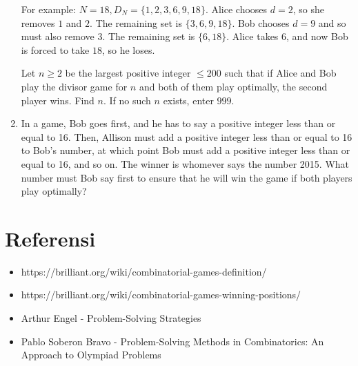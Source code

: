 \documentclass[11pt]{scrartcl}
\begin{document}
\begin{enumerate}
    For example: $ N = 18, D_N = \{ 1,2,3,6,9,18 \} $. Alice chooses $ d=2 $, so she removes $ 1 $ and $ 2 $. The remaining set is $ \{3,6,9,18\} $. Bob chooses $ d = 9 $ and so must also remove $ 3 $. The remaining set is $ \{6,18\} $. Alice takes $ 6 $, and now Bob is forced to take $ 18 $, so he loses.

    Let $ n \ge 2 $ be the largest positive integer $ \le 200 $ such that if Alice and Bob play the divisor game for $ n $ and both of them play optimally, the second player wins. Find $ n $. If no such $ n $ exists, enter $ 999 $.

    \item In a game, Bob goes first, and he has to say a positive integer less than or equal to 16. Then, Allison must add a positive integer less than or equal to 16 to Bob’s number, at which point Bob must add a positive integer less than or equal to 16, and so on. The winner is whomever says the number 2015. What number must Bob say first to ensure that he will win the game if both players play optimally?
\end{enumerate}

\section{Referensi}
\begin{itemize}
    \item https://brilliant.org/wiki/combinatorial-games-definition/
    \item https://brilliant.org/wiki/combinatorial-games-winning-positions/
    \item Arthur Engel - Problem-Solving Strategies
    \item Pablo Soberon Bravo - Problem-Solving Methods in Combinatorics: An Approach to Olympiad Problems
\end{itemize}
\end{document}
